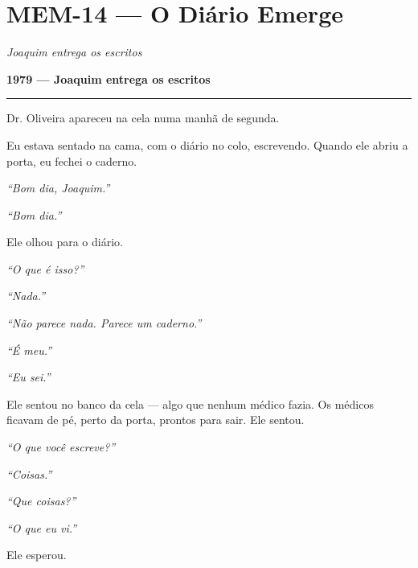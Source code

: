 \section*{\textbf{MEM-14} --- O Diário Emerge}

\noindent \textit{Joaquim entrega os escritos}

\noindent \textbf{1979 --- Joaquim entrega os escritos}

\vspace{0.5em}\noindent\rule{\textwidth}{0.5pt}\vspace{0.5em}

\noindent Dr. Oliveira apareceu na cela numa manhã de segunda.

\noindent Eu estava sentado na cama, com o diário no colo, escrevendo. Quando ele abriu a porta, eu fechei o caderno.

\noindent \textit{\textquotedblleft{}Bom dia, Joaquim.\textquotedblright{}}

\noindent \textit{\textquotedblleft{}Bom dia.\textquotedblright{}}

\noindent Ele olhou para o diário.

\noindent \textit{\textquotedblleft{}O que é isso?\textquotedblright{}}

\noindent \textit{\textquotedblleft{}Nada.\textquotedblright{}}

\noindent \textit{\textquotedblleft{}Não parece nada. Parece um caderno.\textquotedblright{}}

\noindent \textit{\textquotedblleft{}É meu.\textquotedblright{}}

\noindent \textit{\textquotedblleft{}Eu sei.\textquotedblright{}}

\noindent Ele sentou no banco da cela --- algo que nenhum médico fazia. Os médicos ficavam de pé, perto da porta, prontos para sair. Ele sentou.

\noindent \textit{\textquotedblleft{}O que você escreve?\textquotedblright{}}

\noindent \textit{\textquotedblleft{}Coisas.\textquotedblright{}}

\noindent \textit{\textquotedblleft{}Que coisas?\textquotedblright{}}

\noindent \textit{\textquotedblleft{}O que eu vi.\textquotedblright{}}

\noindent Ele esperou.

